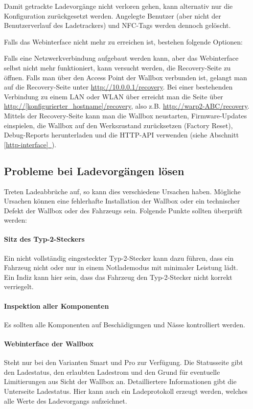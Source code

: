 \documentclass[a4paper,10pt]{article}
\newcommand*{\fullref}[1]{Abschnitt \hyperref[{#1}]{\ref*{#1}~\nameref*{#1}}}
\begin{document}
\begin{multicols*}{2}
    Damit getrackte Ladevorgänge nicht verloren gehen, kann alternativ nur die Konfiguration zurückgesetzt werden.
    Angelegte Benutzer (aber nicht der Benutzerverlauf des Ladetrackers) und NFC-Tags werden dennoch gelöscht.

    Falls das Webinterface nicht mehr zu erreichen ist, bestehen folgende Optionen:

    Falls eine Netzwerkverbindung aufgebaut werden kann, aber das Webinterface
	selbst nicht mehr funktioniert, kann versucht werden, die Recovery-Seite zu öffnen.
    Falls man über den Access Point der Wallbox verbunden ist, gelangt man auf
	die Recovery-Seite unter \url{http://10.0.0.1/recovery}. Bei einer bestehenden Verbindung zu einem LAN oder WLAN über 
	erreicht man die Seite über \url{http://[konfigurierter_hostname]/recovery}, also z.B. \url{http://warp2-ABC/recovery}.
    Mittels der Recovery-Seite kann man die Wallbox neustarten, Firmware-Updates einspielen,
    die Wallbox auf den Werkszustand zurücksetzen (Factory Reset), Debug-Reports
    herunterladen und die HTTP-API verwenden (siehe \fullref{http-interface}).

    \subsection{Probleme bei Ladevorgängen lösen}
    Treten Ladeabbrüche auf, so kann dies verschiedene Ursachen haben. Mögliche
    Ursachen können eine fehlerhafte Installation der Wallbox oder ein
    technischer Defekt der Wallbox oder des Fahrzeugs sein.
    Folgende Punkte sollten überprüft werden:

    \paragraph*{Sitz des Typ-2-Steckers} Ein nicht vollständig eingesteckter Typ-2-Stecker kann dazu führen,
        dass ein Fahrzeug nicht oder nur in einem Notlademodus mit minimaler Leistung lädt. Ein Indiz kann hier sein, dass
        das Fahrzeug den Typ-2-Stecker nicht korrekt verriegelt.
    \paragraph{Inspektion aller Komponenten} Es sollten alle Komponenten
        auf Beschädigungen und Nässe kontrolliert werden.
    \paragraph{Webinterface der Wallbox} Steht nur bei den Varianten Smart und
        Pro zur Verfügung. Die Statusseite gibt den Ladestatus, den erlaubten Ladestrom und den Grund für eventuelle Limitierungen aus
        Sicht der Wallbox an. Detailliertere Informationen gibt die
        Unterseite Ladestatus. Hier kann auch ein Ladeprotokoll
        erzeugt werden, welches alle Werte des Ladevorgangs aufzeichnet.

\end{multicols*}
\end{document}

